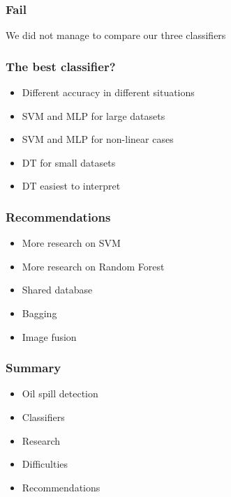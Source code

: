\documentclass{beamer}
\begin{document}
\begin{frame}
\frametitle{Fail}

	\centerline{We did not manage to compare our three classifiers}

\end{frame}


\begin{frame}
\frametitle{The best classifier?}

	\begin{itemize}
		\item Different accuracy in different situations
		\item SVM and MLP for large datasets
		\item SVM and MLP for non-linear cases
		\item DT for small datasets
		\item DT easiest to interpret
	\end{itemize}
	
\end{frame}

\begin{frame}
\frametitle{Recommendations}

	\begin{itemize}
		\item More research on SVM
		\item More research on Random Forest
		\item Shared database
		\item Bagging
		\item Image fusion
	\end{itemize}

\end{frame}


\begin{frame}
\frametitle{Summary}

	\begin{itemize}
		\item Oil spill detection
		\item Classifiers
		\item Research
		\item Difficulties
		\item Recommendations
	\end{itemize}

\end{frame}
\end{document}
